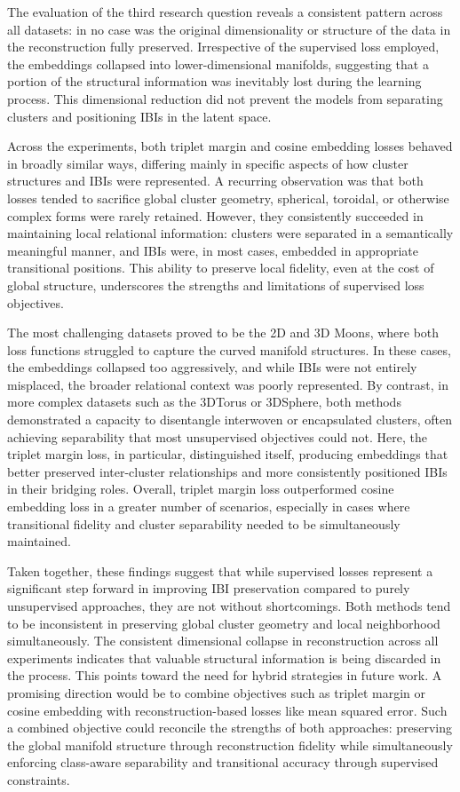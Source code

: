 The evaluation of the third research question reveals a consistent pattern across all datasets: in no case was the original dimensionality or structure of the data in the reconstruction fully preserved. Irrespective of the supervised loss employed, the embeddings collapsed into lower-dimensional manifolds, suggesting that a portion of the structural information was inevitably lost during the learning process. This dimensional reduction did not prevent the models from separating clusters and positioning IBIs in the latent space.

Across the experiments, both triplet margin and cosine embedding losses behaved in broadly similar ways, differing mainly in specific aspects of how cluster structures and IBIs were represented. A recurring observation was that both losses tended to sacrifice global cluster geometry, spherical, toroidal, or otherwise complex forms were rarely retained. However, they consistently succeeded in maintaining local relational information: clusters were separated in a semantically meaningful manner, and IBIs were, in most cases, embedded in appropriate transitional positions. This ability to preserve local fidelity, even at the cost of global structure, underscores the strengths and limitations of supervised loss objectives.

The most challenging datasets proved to be the 2D and 3D Moons, where both loss functions struggled to capture the curved manifold structures. In these cases, the embeddings collapsed too aggressively, and while IBIs were not entirely misplaced, the broader relational context was poorly represented. By contrast, in more complex datasets such as the 3DTorus or 3DSphere, both methods demonstrated a capacity to disentangle interwoven or encapsulated clusters, often achieving separability that most unsupervised objectives could not. Here, the triplet margin loss, in particular, distinguished itself, producing embeddings that better preserved inter-cluster relationships and more consistently positioned IBIs in their bridging roles. Overall, triplet margin loss outperformed cosine embedding loss in a greater number of scenarios, especially in cases where transitional fidelity and cluster separability needed to be simultaneously maintained.

Taken together, these findings suggest that while supervised losses represent a significant step forward in improving IBI preservation compared to purely unsupervised approaches, they are not without shortcomings. Both methods tend to be inconsistent in preserving global cluster geometry and local neighborhood simultaneously. The consistent dimensional collapse in reconstruction across all experiments indicates that valuable structural information is being discarded in the process. This points toward the need for hybrid strategies in future work. A promising direction would be to combine objectives such as triplet margin or cosine embedding with reconstruction-based losses like mean squared error. Such a combined objective could reconcile the strengths of both approaches: preserving the global manifold structure through reconstruction fidelity while simultaneously enforcing class-aware separability and transitional accuracy through supervised constraints.

